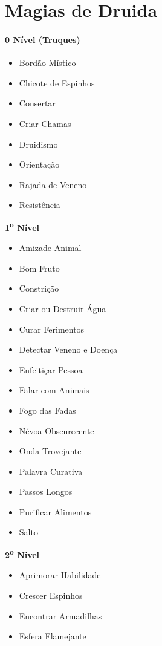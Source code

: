\documentclass[a4paper,12p]{book}
\begin{document}
	\section{Magias de Druida}
		\begin{multicols}{4}
			{ \paragraph{0 Nível (Truques)}
			\begin{itemize}
				\item Bordão Místico
				\item Chicote de Espinhos
				\item Consertar
				\item Criar Chamas
				\item Druidismo
				\item Orientação
				\item Rajada de Veneno
				\item Resistência
			\end{itemize}
		\textbf{1\textsuperscript{o} Nível}
			\begin{itemize}
				\item Amizade Animal
				\item Bom Fruto
				\item Constrição
				\item Criar ou Destruir Água
				\item Curar Ferimentos
				\item Detectar Veneno e Doença
				\item Enfeitiçar Pessoa
				\item Falar com Animais
				\item Fogo das Fadas
				\item Névoa Obscurecente
				\item Onda Trovejante
				\item Palavra Curativa
				\item Passos Longos
				\item Purificar Alimentos
				\item Salto
			\end{itemize}
		\columnbreak
		\textbf{2\textsuperscript{o} Nível}
			\begin{itemize}
				\item Aprimorar Habilidade
				\item Crescer Espinhos
				\item Encontrar Armadilhas
				\item Esfera Flamejante

\end{itemize}}
\end{multicols}
\end{document}
